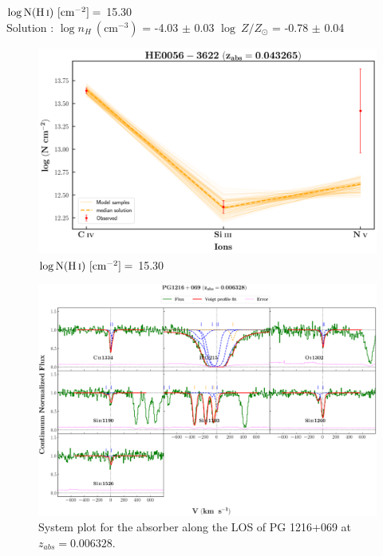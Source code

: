   $\log \text{N}(\ion{H}{i}) \ [\text{cm}^{-2}]=$  15.30  \\ \hspace*{4mm}
  Solution : $\log n_H \ (\text{cm}^{-3})$ = -4.03 $\pm$ 0.03 \hspace{10mm} $\log \ Z/Z_\odot$ = -0.78 $\pm$ 0.04 \\ 
  
  \begin{figure}[!h]
    \centering
    \includegraphics[width=0.9\linewidth]{Ionisation-Modelling-Plots/he0056-z=0.043265-compII_logZ=-1.png}
    \caption{$\log \text{N}(\ion{H}{i}) \ [\text{cm}^{-2}]=$ 15.30}
  \end{figure}
  
  
  \newpage
  \thispagestyle{empty}

  \begin{landscape}
  
  \begin{figure}
      \centering
      \vspace{-10mm}
      \hspace*{-20mm}
      \includegraphics[width=1.1\linewidth]{System-Plots/PG1216+069_z=0.006328_sys_plot.png}
      \caption{System plot for the absorber along the LOS of PG 1216+069 at $z_{abs} = 0.006328$. }
  \end{figure}
  
  \end{landscape}
  
